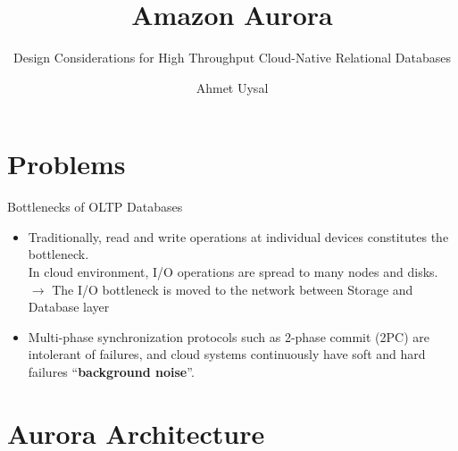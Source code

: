 
\usepackage{../KU-Beamer-Template/style/koc} 
\usepackage{minted}
\usepackage{upquote}

\title{Amazon Aurora} 
\subtitle{Design Considerations for High Throughput Cloud-Native Relational Databases} 
\date{}
\author{Ahmet Uysal}




  \maketitle

    
  \section{Problems}

    \begin{frame}{Bottlenecks of OLTP Databases}
      \begin{itemize}
        \LARGE
      \item Traditionally, read and write operations at individual devices constitutes the bottleneck.\\
      \pause
      In cloud environment, I/O operations are spread to many nodes and disks. \\
      \pause
      $\rightarrow$  The I/O bottleneck is moved to the network between Storage and Database layer \\
      \pause
      \item Multi-phase synchronization protocols such as 2-phase commit (2PC) are intolerant of failures, and cloud systems continuously have soft and hard failures ``\textbf{background noise}''.
      \end{itemize}
    \end{frame}
    
  \section{Aurora\cite{aurora} Architecture}

